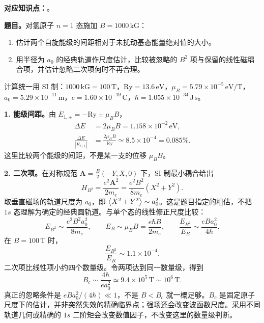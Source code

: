 \textbf{对应知识点：}。

\textbf{题目。}对氢原子 $n=1$ 态施加 $B=1000\,\mathrm{kG}$：
\begin{enumerate}
  \item 估计两个自旋能级的间距相对于未扰动基态能量绝对值的大小。
  \item 用半径为 $a_0$ 的经典轨道作尺度估计，比较被忽略的 $B^2$ 项与保留的线性磁耦合项，并估计忽略二次项何时不再合理。
\end{enumerate}
计算统一用 SI 制：$1000\,\mathrm{kG}=100\,\mathrm T$，$\mathrm{Ry}=13.6\,\mathrm{eV}$，$\mu_B=5.79\times10^{-5}\,\mathrm{eV/T}$，$a_0=5.29\times10^{-11}\,\mathrm m$，$e=1.60\times10^{-19}\,\mathrm C$，$\hbar=1.055\times10^{-34}\,\mathrm{J\,s}$。

\begin{checkedsolution}
\textbf{1. 能级间距。}由 $E_{1,\pm}=-\mathrm{Ry}\pm\mu_BB$，
\begin{align}
  \Delta E&=2\mu_BB=1.158\times10^{-2}\,\mathrm{eV},\\
  \boxed{\frac{\Delta E}{|E_{C,1}|}}
    &=\boxed{\frac{2\mu_BB}{\mathrm{Ry}}
       \simeq8.5\times10^{-4}=0.085\%.}
\end{align}
这里比较两个能级的间距，不是某一支的位移 $\mu_BB$。

\textbf{2. 二次项。}在对称规范 $\mathbf A=\tfrac B2(-Y,X,0)$ 下，SI 制最小耦合给出
\begin{equation}
  H_{B^2}=\frac{e^2\mathbf A^2}{2m_e}
    =\frac{e^2B^2}{8m_e}(X^2+Y^2).
\end{equation}
取垂直磁场的轨道尺度为 $a_0$，即 $\left\langle X^2+Y^2 \right\rangle\sim a_0^2$。这是题目指定的粗估，不把 $1s$ 态理解为确定的经典圆轨道。与单个态的线性修正尺度比较：
\begin{equation}
  E_{B^2}\sim\frac{e^2B^2a_0^2}{8m_e},\qquad
  E_B\sim\mu_BB=\frac{e\hbar B}{2m_e},\qquad
  \boxed{\frac{E_{B^2}}{E_B}\sim\frac{eBa_0^2}{4\hbar}.}
\end{equation}
在 $B=100\,\mathrm T$ 时，
\begin{equation}
  \boxed{\frac{E_{B^2}}{E_B}\sim1.1\times10^{-4}.}
\end{equation}
二次项比线性项小约四个数量级。令两项达到同一数量级，得到
\begin{equation}
  \boxed{B_c\sim\frac{4\hbar}{ea_0^2}
    \simeq9.4\times10^5\,\mathrm T\sim10^6\,\mathrm T.}
\end{equation}
真正的忽略条件是 $eBa_0^2/(4\hbar)\ll1$，不是 $B<B_c$ 就一概足够。$B_c$ 是固定原子尺度下的估计，并非突然失效的精确临界点；强场还会改变波函数尺度。采用不同轨道几何或精确的 $1s$ 二阶矩会改变数值因子，不改变这里的数量级判断。
\end{checkedsolution}

